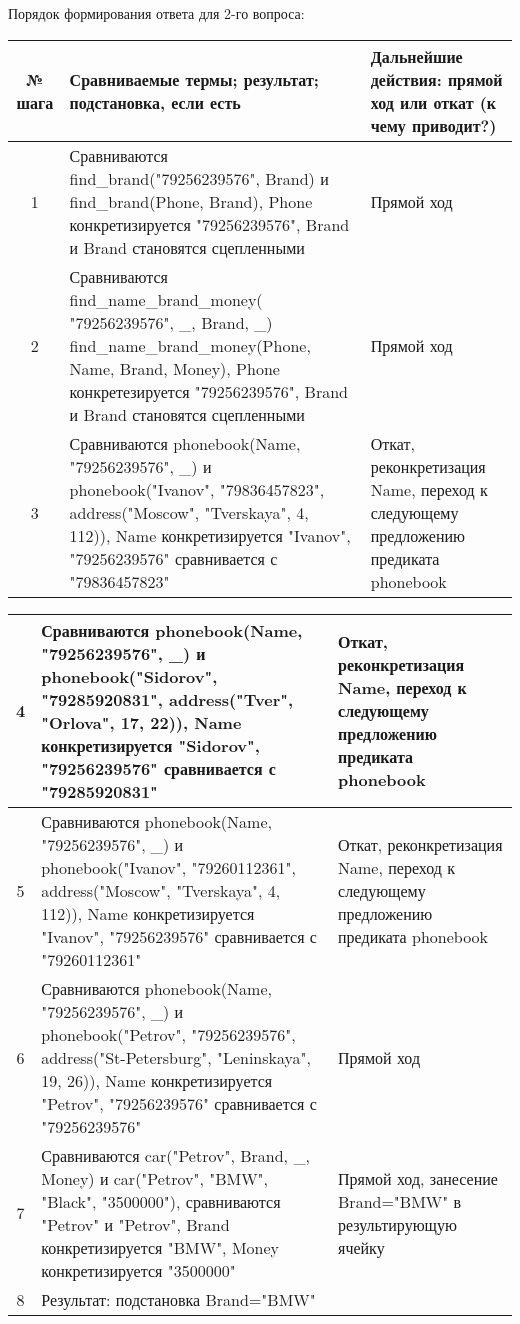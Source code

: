 \documentclass[a4paper,12pt]{article}
\begin{document}
Порядок формирования ответа для 2-го вопроса:
\begin{table}[!ht]
	\begin{tabularx}{\linewidth}{|c|>{\centering}X|>{\centering}X|}
	\hline
	№ шага & Сравниваемые термы; результат; подстановка, если есть & Дальнейшие действия: прямой ход или откат (к чему приводит?)\tabularnewline
	\hline
	1 & Сравниваются find\_brand("79256239576"{}, Brand) и find\_brand(Phone, Brand), Phone конкретизируется "79256239576"{}, Brand и Brand становятся сцепленными  & Прямой ход \tabularnewline
	\hline
	2 & Сравниваются find\_name\_brand\_money( "79256239576"{}, \_, Brand, \_) find\_name\_brand\_money(Phone, Name, Brand, Money), Phone конкретезируется "79256239576"{}, Brand и Brand становятся сцепленными &  Прямой ход  \tabularnewline
	\hline
	3 & Сравниваются phonebook(Name, "79256239576"{}, \_) и phonebook("Ivanov"{}, "79836457823"{}, address("Moscow"{}, "Tverskaya"{}, 4, 112)), Name конкретизируется "Ivanov"{}, "79256239576" сравнивается с "79836457823" & Откат, реконкретизация Name, переход к следующему предложению предиката phonebook \tabularnewline
	\hline
				\end{tabularx}
\end{table}
\newpage
\begin{table}[ht!] 
\begin{tabularx}{\linewidth}{|c|>{\centering}X|>{\centering}X|}
\hline
	4 & Сравниваются phonebook(Name, "79256239576"{}, \_) и phonebook("Sidorov"{}, "79285920831"{}, address("Tver"{}, "Orlova"{}, 17, 22)), Name конкретизируется "Sidorov"{}, "79256239576" сравнивается с "79285920831" & Откат, реконкретизация Name, переход к следующему предложению предиката phonebook \tabularnewline
	\hline
	5 & Сравниваются phonebook(Name, "79256239576"{}, \_) и phonebook("Ivanov"{}, "79260112361"{}, address("Moscow"{}, "Tverskaya"{}, 4, 112)), Name конкретизируется "Ivanov"{}, "79256239576" сравнивается с "79260112361" & Откат, реконкретизация Name, переход к следующему предложению предиката phonebook \tabularnewline
	\hline
	6 & Сравниваются phonebook(Name, "79256239576"{}, \_) и phonebook("Petrov"{}, "79256239576"{}, address("St-Petersburg"{}, "Leninskaya{}", 19, 26)), Name конкретизируется "Petrov"{}, "79256239576" сравнивается с "79256239576" & Прямой ход \tabularnewline
	\hline
	7 & Сравниваются car("Petrov"{}, Brand, \_, Money) и car("Petrov"{}, "BMW"{}, "Black"{}, "3500000"), сравниваются "Petrov" и "Petrov"{}, Brand конкретизируется  "BMW"{}, Money конкретизируется "3500000" & Прямой ход, занесение Brand="BMW" в результирующую ячейку \tabularnewline
	\hline
	8 & Результат: подстановка Brand="BMW" &  \tabularnewline
	\hline
\end{tabularx}
\end{table}		
\end{document}
